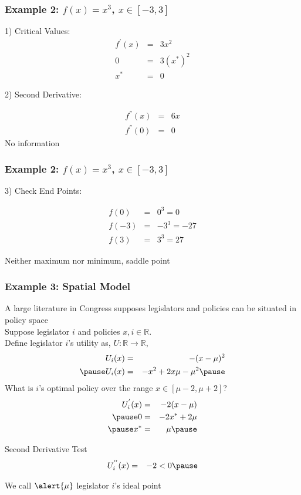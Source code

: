 \documentclass[aspectratio=169]{beamer}
\numberwithin{equation}{section}
\begin{document}
\begin{frame}
\frametitle{Example 2: $f(x) = x^3$, $x \in [-3, 3] $ }

1) Critical Values: 
\begin{eqnarray}
f^{'}(x) & = & 3x^2 \nonumber \\
0 & = & 3 (x^{*})^{2} \nonumber \\
x^{*} & = & 0 \nonumber 
\end{eqnarray} \pause

2) Second Derivative: 

\begin{eqnarray}
f^{''}(x) & = & 6 x \nonumber \\
f^{''}(0) & = &  0 \nonumber 
\end{eqnarray}
\alert{No information}

\end{frame}



\begin{frame}
\frametitle{Example 2: $f(x) = x^3$, $x \in [-3, 3] $}


3) Check End Points: 

\begin{eqnarray}
f(0) & = & 0^3  = 0 \nonumber \\
f(-3) & = & -3^3 = -27 \nonumber \\
f(3) & = & 3^3 = 27 \nonumber 
\end{eqnarray}

Neither maximum nor minimum, \alert{saddle point} 

\end{frame}



\begin{frame}
\frametitle{Example 3: Spatial Model}
A large literature in Congress supposes legislators and policies can be situated in \alert{policy space} \pause \\

Suppose legislator $i$ and policies $x, i \in \mathbb{R}$. \pause  \\
Define legislator $i$'s utility as, $U:\mathbb{R} \rightarrow \mathbb{R}$, \pause 
\begin{eqnarray}
U_{i} (x) & = & - (x - \mu)^{2}  \nonumber \\ \pause 
U_{i}(x) & = & - x^2 +  2 x \mu  - \mu^2 \nonumber \pause 
\end{eqnarray}
What is $i$'s optimal policy over the range $x \in [\mu- 2, \mu + 2]$? \pause 
\begin{eqnarray}
U_{i}^{'} (x) & = & -2 (x - \mu) \nonumber \\ \pause 
0 & = & -2x^{*} + 2 \mu \nonumber \\ \pause 
x^{*} & = & \mu \nonumber \pause 
\end{eqnarray}

\alert{Second Derivative Test} \pause 
\begin{eqnarray}
U^{''}_{i}(x)  & = & -2 <0  \nonumber \pause 
\end{eqnarray}

We call $\alert{\mu}$ legislator $i$'s \alert{ideal point} 

\end{frame} 
\end{document}
